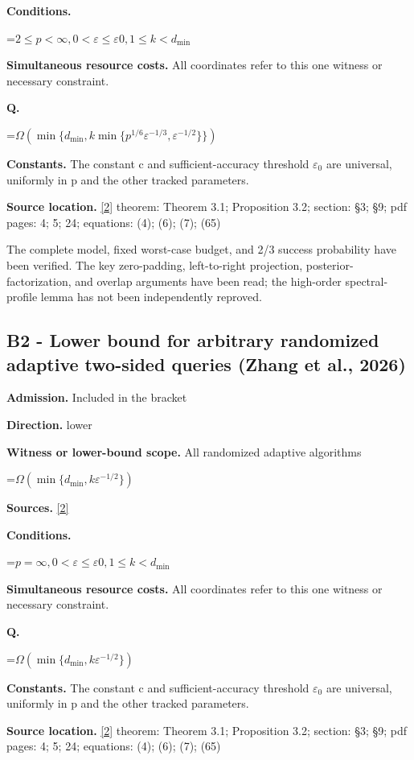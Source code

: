 \documentclass[10pt,a4paper]{article}
\newcommand{\AtlasMath}[1]{\par\begingroup\centering\setbox0=\hbox{$\displaystyle #1$}\ifdim\wd0>1.4\linewidth\typeout{ATLAS WIDE FORMULA: \the\wd0}\fi\ifdim\wd0>\linewidth\resizebox{\linewidth}{!}{\box0}\else\box0\fi\par\endgroup}
\begin{document}
\textbf{Conditions.}

\AtlasMath{2\le p<\infty , 0<\varepsilon \le \varepsilon 0, 1\le k<d_{\mathrm{min}}}
\textbf{Simultaneous resource costs.} All coordinates refer to this one witness or necessary constraint.

\textbf{Q.}

\AtlasMath{\Omega(\min\{d_{\mathrm{min}},k\min\{p^{1/6}\varepsilon^{-1/3},\varepsilon^{-1/2}\}\})}
\textbf{Constants.} The constant c and sufficient-accuracy threshold $\varepsilon _0$ are universal, uniformly in p and the other tracked parameters.

\textbf{Source location.} \href{https://arxiv.org/pdf/2609.35840v2}{[2]} theorem: Theorem 3.1; Proposition 3.2; section: §3; §9; pdf pages: 4; 5; 24; equations: (4); (6); (7); (65)

The complete model, fixed worst-case budget, and 2/3 success probability have been verified. The key zero-padding, left-to-right projection, posterior-factorization, and overlap arguments have been read; the high-order spectral-profile lemma has not been independently reproved.

\subsection{B2 - Lower bound for arbitrary randomized adaptive two-sided queries (Zhang et al., 2026)}
\textbf{Admission.} Included in the bracket

\textbf{Direction.} lower

\textbf{Witness or lower-bound scope.} All randomized adaptive algorithms

\AtlasMath{\Omega(\min\{d_{\mathrm{min}},k\varepsilon^{-1/2}\})}
\textbf{Sources.} \href{https://arxiv.org/pdf/2609.35840v2}{[2]}

\textbf{Conditions.}

\AtlasMath{p=\infty , 0<\varepsilon \le \varepsilon 0, 1\le k<d_{\mathrm{min}}}
\textbf{Simultaneous resource costs.} All coordinates refer to this one witness or necessary constraint.

\textbf{Q.}

\AtlasMath{\Omega(\min\{d_{\mathrm{min}},k\varepsilon^{-1/2}\})}
\textbf{Constants.} The constant c and sufficient-accuracy threshold $\varepsilon _0$ are universal, uniformly in p and the other tracked parameters.

\textbf{Source location.} \href{https://arxiv.org/pdf/2609.35840v2}{[2]} theorem: Theorem 3.1; Proposition 3.2; section: §3; §9; pdf pages: 4; 5; 24; equations: (4); (6); (7); (65)
\end{document}
